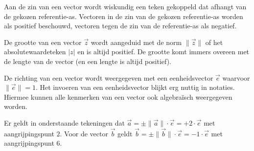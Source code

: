 \documentclass{ximera}
\begin{document}
Aan de zin van een vector wordt wiskundig een teken gekoppeld dat afhangt van de gekozen referentie-as. 
Vectoren in de zin van de gekozen referentie-as worden als positief beschouwd, vectoren tegen de zin van de referentie-as als negatief. 

De grootte van een vector \(\vec{z}\) wordt aangeduid met de norm $ \lVert \vec{z} \rVert $  of het absolutewaardeteken $\lvert z \rvert $ en is altijd positief. 
De grootte komt immers overeen met de lengte van de vector (en een lengte is altijd positief). 







De richting van een vector wordt weergegeven met een eenheidsvector $\vec{e}$ waarvoor $ \lVert \vec{e} \rVert = 1$. 
Het invoeren van een eenheidsvector blijkt erg nuttig in notaties. 
Hiermee kunnen alle kenmerken van een vector ook algebraïsch weergegeven worden. 

Er geldt in onderstaande tekeningen dat \(\vec{a} = \pm  \lVert \vec{a} \rVert \cdot \vec{e} = +2 \cdot \vec{e} \) met aangrijpingspunt \(2\). 
Voor de vector \(\vec{b}\) geldt \(\vec{b} = \pm  \lVert \vec{b} \rVert \cdot \vec{e} = -1 \cdot \vec{e} \) met aangrijpingspunt \(6\). 

\end{document}
